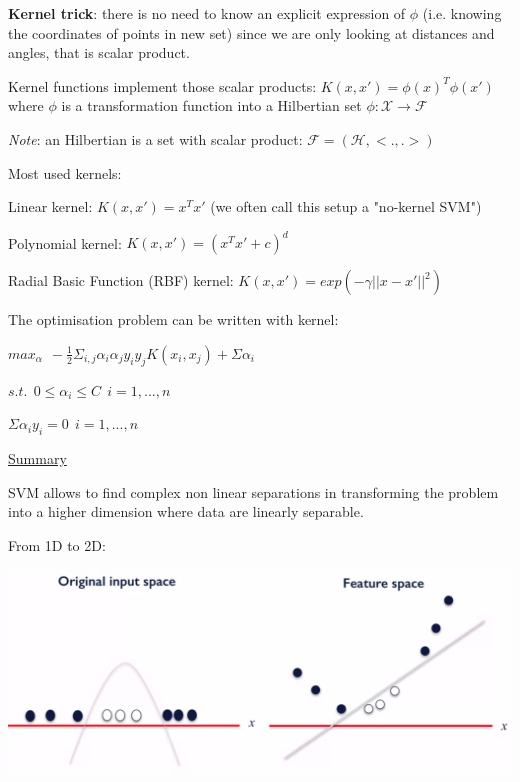 \textbf{Kernel trick}: there is no need to know an explicit expression of $\phi$ (i.e. knowing the coordinates of points in new set) since we are only looking at distances and angles, that is scalar product.

\vspace{5mm}

Kernel functions implement those scalar products: $K(x,x')=\phi(x)^T \phi(x')$ where $\phi$ is a transformation function into a Hilbertian set $\phi : \mathcal{X} \to \mathcal{F} $

\textit{Note}: an Hilbertian is a set with scalar product: $\mathcal{F}=(\mathcal{H},<.,.>)$

\vspace{5mm}

Most used kernels:

Linear kernel: $K(x,x') = x^Tx'$ (we often call this setup a "no-kernel SVM")

Polynomial kernel: $K(x,x') = (x^Tx'+c)^d$

Radial Basic Function (RBF) kernel: $K(x,x') = exp(-\gamma||x-x'||^2)$

\vspace{5mm}

The optimisation problem can be written with kernel:

\begin{center}

$max_\alpha~~-\frac{1}{2}\Sigma_{i,j} \alpha_i \alpha_j y_i y_j K(x_i,x_j) + \Sigma \alpha_i$

$s.t.~~0 \leq \alpha_i \leq C~~i=1,...,n$

$\Sigma \alpha_i y_i = 0~~i=1,...,n$

\end{center}

\vspace{5mm}

\underline{Summary}

\vspace{5mm}

SVM allows to find complex non linear separations in transforming the problem into a higher dimension where data are linearly separable.

\vspace{5mm}

From 1D to 2D:

\begin{center}
\includegraphics[scale=0.15]{kernel_2D.png}
\end{center}

